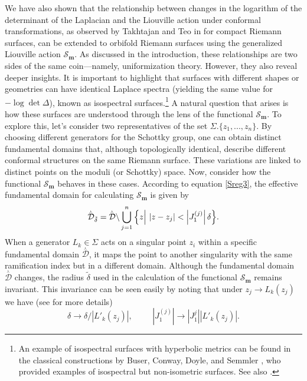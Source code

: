 \documentclass[a4paper,11pt]{article}
\newcommand{\Gpotential}{\mathscr{S}}
\newcommand{\singfund}{\overset{{}_{\curlywedge}}{\mathcal{D}}}
\begin{document}
We have also shown that the relationship between changes in the logarithm of the determinant of the Laplacian and the Liouville action under conformal transformations, as observed by Takhtajan and Teo in \cite{Takhtajan_2003} for compact Riemann surfaces, can be extended to orbifold Riemann surfaces using the generalized Liouville action $\Gpotential_{\boldsymbol{m}}$. As discussed in the introduction, these relationships are two sides of the same coin—namely, uniformization theory. However, they also reveal deeper insights. It is important to highlight that surfaces with different shapes or geometries can have identical Laplace spectra (yielding the same value for $-\log\det\Delta$), known as isospectral surfaces.\footnote{An example of isospectral surfaces with hyperbolic metrics can be found in the classical constructions by Buser, Conway, Doyle, and Semmler \cite{buser2010some}, who provided examples of isospectral but non-isometric surfaces. See also \cite{vigneras1980varietes,sunada1985riemannian,gordon1992one}.} A natural question that arises is how these surfaces are understood through the lens of the functional $\Gpotential_{\boldsymbol{m}}$. To explore this, let’s consider two representatives of the set $\Sigma.\{z_1,...,z_n\}$. By choosing different generators for the Schottky group, one can obtain distinct fundamental domains that, although topologically identical, describe different conformal structures on the same Riemann surface. These variations are linked to distinct points on the moduli (or Schottky) space. Now, consider how the functional $\Gpotential_{\boldsymbol{m}}$ behaves in these cases. According to equation \eqref{Sreg3}, the effective fundamental domain for calculating  $\Gpotential_{\boldsymbol{m}}$ is given by
\begin{equation}
\singfund_{\tilde\delta} = \singfund\backslash \bigcup_{j=1}^n \Big{\{} z\Big|~|z-z_j| < \left|J_1^{(j)}\right| \delta\Big{\}}.\label{D1}\nonumber
\end{equation}
When a generator $L_k\in\Sigma$ acts on a singular point $z_i$
within a specific fundamental domain $\singfund$, it maps the point to another singularity with the same ramification index but in a different domain. Although the fundamental domain $\singfund$ changes, the radius $\tilde\delta$ used in the calculation of the functional $\Gpotential_{\boldsymbol{m}}$ remains invariant. This invariance can be seen easily by noting that under $z_j \rightarrow L_k(z_j)$ we have (see \cite{Taghavi2024classical} for more details)
\begin{equation}
\delta \rightarrow \delta/\left|L'_k(z_j)\right|,\hspace{1cm}\left|J_{1}^{(j)}\right| \rightarrow \left|J_1^{j}\right| \left|L'_k(z_j)\right|.\nonumber
\end{equation}
\end{document}
